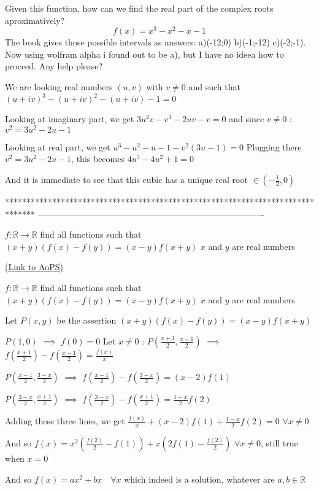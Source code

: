 \begin{solution}
	\begin{tcolorbox}Given this function, how can we find the real part of the complex roots aproximatively?$$f(x)=x^3-x^2-x-1$$
The book gives those possible intervals as answers: a)(-1\/2;0) b)(-1;-1\/2) c)(-2;-1). Now using wolfram alpha i found out to be a), but I have no ideea how to proceed. Any help please?\end{tcolorbox}
We are looking real numbers $(u,v)$ with $v\ne 0$ and such that 
$(u+iv)^3-(u+iv)^2-(u+iv)-1=0$

Looking at imaginary part, we get $3u^2v-v^3-2uv-v=0$ and since $v\ne 0$ : 
$v^2=3u^2-2u-1$

Looking at real part, we get $u^3-u^2-u-1-v^2(3u-1)=0$
Plugging there $v^2=3u^2-2u-1$, this becomes
$4u^3-4u^2+1=0$

And it is immediate to see that this cubic has a unique real root $\in(-\frac 12,0)$


\end{solution}
*******************************************************************************
-------------------------------------------------------------------------------

\begin{problem}
	$f :\mathbb{R} \to \mathbb{R}$ find all functions such that
$(x+y)(f(x)-f(y))=(x-y)f(x+y)$
$x$ and $y$ are real numbers

	\flushright \href{https://artofproblemsolving.com/community/c6h1598114}{(Link to AoPS)}
\end{problem}



\begin{solution}
	\begin{tcolorbox}$f :\mathbb{R} \to \mathbb{R}$ find all functions such that
$(x+y)(f(x)-f(y))=(x-y)f(x+y)$
$x$ and $y$ are real numbers\end{tcolorbox}
Let $P(x,y)$ be the assertion $(x+y)(f(x)-f(y))=(x-y)f(x+y)$

$P(1,0)$ $\implies$ $f(0)=0$
Let $x\ne 0$ :
$P(\frac{x+1}2,\frac{x-1}2)$ $\implies$ $f(\frac{x+1}2)-f(\frac{x-1}2)=\frac{f(x)}x$

$P(\frac{x-1}2,\frac{3-x}2)$ $\implies$ $f(\frac{x-1}2)-f(\frac{3-x}2)=(x-2)f(1)$

$P(\frac{3-x}2,\frac{x+1}2)$ $\implies$ $f(\frac{3-x}2)-f(\frac{x+1}2)=\frac{1-x}2f(2)$

Adding these three lines, we get 
$\frac{f(x)}x+(x-2)f(1)+\frac{1-x}2f(2)=0$ $\forall x\ne 0$ 

And so $f(x)=x^2(\frac{f(2)}2-f(1))+x(2f(1)-\frac{f(2)}2)$ $\forall x\ne 0$, still true when $x=0$

And so $\boxed{f(x)=ax^2+bx\quad\forall x}$ which indeed is a solution, whatever are $a,b\in\mathbb R$
\end{solution}



